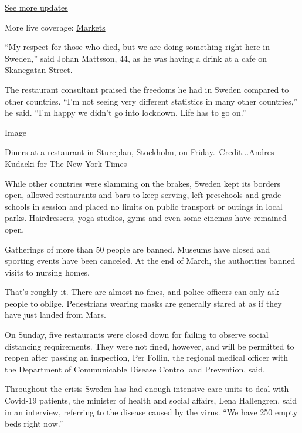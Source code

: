 \href{https://www.nytimes3xbfgragh.onion/2020/09/11/world/covid-19-coronavirus.html?action=click\&pgtype=Article\&state=default\&region=MAIN_CONTENT_1\&context=storylines_live_updates}{See
more updates}

More live coverage:
\href{https://www.nytimes3xbfgragh.onion/live/2020/09/11/business/stock-market-today-coronavirus?action=click\&pgtype=Article\&state=default\&region=MAIN_CONTENT_1\&context=storylines_live_updates}{Markets}

``My respect for those who died, but we are doing something right here
in Sweden,'' said Johan Mattsson, 44, as he was having a drink at a cafe
on Skanegatan Street.

The restaurant consultant praised the freedoms he had in Sweden compared
to other countries. ``I'm not seeing very different statistics in many
other countries,'' he said. ``I'm happy we didn't go into lockdown. Life
has to go on.''

Image

Diners at a restaurant in Stureplan, Stockholm, on
Friday.~Credit...Andres Kudacki for The New York Times

While other countries were slamming on the brakes, Sweden kept its
borders open, allowed restaurants and bars to keep serving, left
preschools and grade schools in session and placed no limits on public
transport or outings in local parks. Hairdressers, yoga studios, gyms
and even some cinemas have remained open.

Gatherings of more than 50 people are banned. Museums have closed and
sporting events have been canceled. At the end of March, the authorities
banned visits to nursing homes.

That's roughly it. There are almost no fines, and police officers can
only ask people to oblige. Pedestrians wearing masks are generally
stared at as if they have just landed from Mars.

On Sunday, five restaurants were closed down for failing to observe
social distancing requirements. They were not fined, however, and will
be permitted to reopen after passing an inspection, Per Follin, the
regional medical officer with the Department of Communicable Disease
Control and Prevention, said.

Throughout the crisis Sweden has had enough intensive care units to deal
with Covid-19 patients, the minister of health and social affairs, Lena
Hallengren, said in an interview, referring to the disease caused by the
virus. ``We have 250 empty beds right now.''

